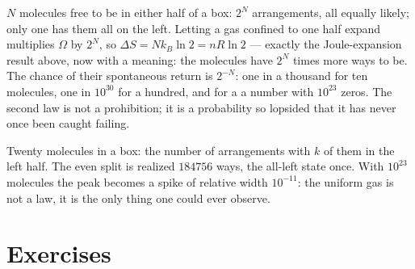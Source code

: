 \begin{example}\label{ex:b1:second-law-entropy:count}
$N$ molecules free to be in either half of a box: $2^N$ arrangements,
all equally likely; only one has them all on the left. Letting a gas
confined to one half expand multiplies $\Omega$ by $2^N$, so $\Delta S =
Nk_B\ln2 = nR\ln2$ --- exactly the Joule-expansion result above, now with
a meaning: the molecules have $2^N$ times more ways to be. The chance of
their spontaneous return is $2^{-N}$: one in a thousand for ten
molecules, one in $10^{30}$ for a hundred, and for a  a number with
$10^{23}$ zeros. The second law is not a prohibition; it is a probability
so lopsided that it has never once been caught failing.
\end{example}

\begin{omfigure}

{\small Twenty molecules in a box: the number of arrangements with $k$
of them in the left half. The even split is realized $184756$ ways, the
all-left state once. With $10^{23}$ molecules the peak becomes a spike
of relative width $10^{-11}$: the uniform gas is not a law, it is the
only thing one could ever observe.}
\end{omfigure}

\section{Exercises}

